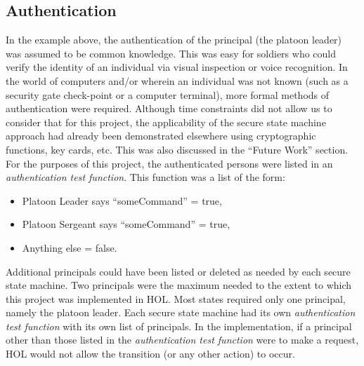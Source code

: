 \subsection{Authentication}
\label{sec:authentication-1}

In the example above, the authentication of the principal (the platoon leader) was
assumed to be common knowledge. This was easy for soldiers who
could verify the identity of an individual via visual inspection or voice recognition.
In the world of computers and/or wherein an individual was not known (such as a
security gate check-point or a computer terminal), more formal methods of authentication
were required. Although time constraints did not allow us to consider that for this
project, the applicability of the secure state machine approach had already been
demonstrated elsewhere using cryptographic functions, key cards, etc. This was also
discussed in the “Future Work” section.\\

For the purposes of this project, the authenticated persons were listed in an \textit{authentication test
function}. This function was a list of the form:
\begin{itemize}
\item Platoon Leader says “someCommand” = true,
\item Platoon Sergeant says “someCommand” = true,
\item Anything else = false.
\end{itemize}

Additional principals could have been listed or deleted as needed by each secure
state machine. Two principals were the maximum needed to the extent to which this
project was implemented in HOL. Most states required only one principal, namely
the platoon leader. Each secure state machine had its own \textit{authentication test
function} with its own list of principals. In the implementation, if a principal
other than those listed in the \textit{authentication test function} were to make a request,
HOL would not allow the transition (or any other action) to occur.\\

